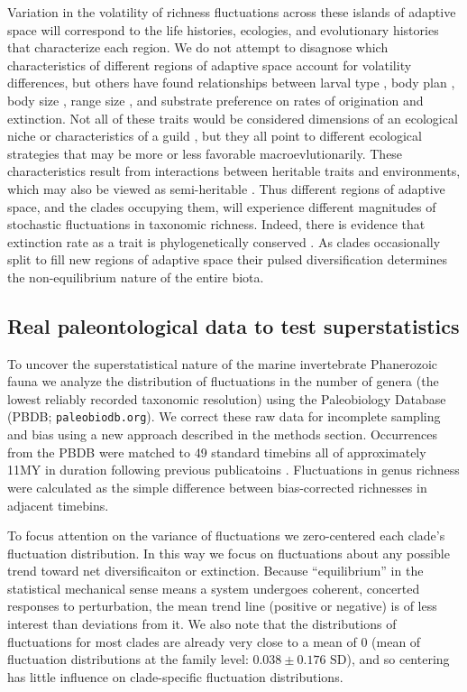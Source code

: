 \documentclass[12pt]{article}
\let\citep=\cite
\begin{document}
Variation in the volatility of richness fluctuations across these
islands of adaptive space will correspond to the life histories,
ecologies, and evolutionary histories that characterize each
region. We do not attempt to disagnose which characteristics of
different regions of adaptive space account for volatility
differences, but others have found relationships between larval type
\citep{jablonski2008}, body plan \citep{erwin2012}, body size
\citep{harnik2011}, range size \citep{harnik2011, foote2008paleobiol},
and substrate preference \citep{hopkins2014} on rates of origination
and extinction. Not all of these traits would be considered dimensions
of an ecological niche or characteristics of a guild \citep{bambach},
but they all point to different ecological strategies that may be more
or less favorable macroevlutionarily. These characteristics result
from interactions between heritable traits and environments, which may
also be viewed as semi-heritable \citep{nicheCons}. Thus different
regions of adaptive space, and the clades occupying them, will
experience different magnitudes of stochastic fluctuations in
taxonomic richness. Indeed, there is evidence that extinction rate as
a trait is phylogenetically conserved
\citep{rabosky2009heritability}. As clades occasionally split to fill
new regions of adaptive space their pulsed diversification determines
the non-equilibrium nature of the entire biota.


\subsection*{Real paleontological data to test superstatistics}

To uncover the superstatistical nature of the marine invertebrate
Phanerozoic fauna we analyze the distribution of fluctuations in the
number of genera (the lowest reliably recorded taxonomic resolution)
using the Paleobiology Database (PBDB; {\tt paleobiodb.org}). We
correct these raw data for incomplete sampling and bias using a new
approach described in the methods section. Occurrences from the PBDB
were matched to 49 standard timebins all of approximately 11MY in
duration following previous publicatoins \citep{alroy08,
  alroy2010}. Fluctuations in genus richness were calculated as the
simple difference between bias-corrected richnesses in adjacent
timebins. 

To focus attention on the variance of fluctuations we zero-centered
each clade's fluctuation distribution. In this way we focus on
fluctuations about any possible trend toward net diversificaiton or
extinction. Because ``equilibrium'' in the statistical mechanical
sense means a system undergoes coherent, concerted responses to
perturbation, the mean trend line (positive or negative) is of less
interest than deviations from it. We also note that the distributions
of fluctuations for most clades are already very close to a mean of 0
(mean of fluctuation distributions at the family level:
$0.038 \pm 0.176 \text{ SD}$), and so centering has little influence
on clade-specific fluctuation distributions.
\end{document}
